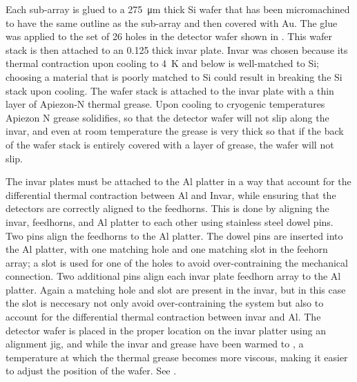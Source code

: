 Each sub-array is glued to a \SI{275}{\um} thick Si wafer that has been micromachined to have the same outline as the sub-array and then covered with Au.
The glue was applied to the set of 26 holes in the detector wafer shown in .
This wafer stack is then attached to an \SI{0.125}{\in} thick invar plate.
Invar was chosen because its thermal contraction upon cooling to \SI{4}{\K} and below is well-matched to Si; choosing a material that is poorly matched to Si could result in breaking the Si stack upon cooling.
The wafer stack is attached to the invar plate with a thin layer of Apiezon-N thermal grease.
Upon cooling to cryogenic temperatures Apiezon N grease solidifies, so that the detector wafer will not slip along the invar, and even at room temperature the grease is very thick so that if the back of the wafer stack is entirely covered with a layer of grease, the wafer will not slip.

The invar plates must be attached to the Al platter in a way that account for the differential thermal contraction between Al and Invar, while ensuring that the detectors are correctly aligned to the feedhorns.
This is done by aligning the invar, feedhorns, and Al platter to each other using stainless steel dowel pins.
Two pins align the feedhorns to the Al platter.
The dowel pins are inserted into the Al platter, with one matching hole and one matching slot in the feehorn array; a slot is used for one of the holes to avoid over-contraining the mechanical connection.
Two additional pins align each invar plate feedhorn array to the Al platter.
Again a matching hole and slot are present in the invar, but in this case the slot is neccesary not only avoid over-contraining the system but also to account for the differential thermal contraction between invar and Al.
The detector wafer is placed in the proper location on the invar platter using an alignment jig, and while the invar and grease have been warmed to , a temperature at which the thermal grease becomes more viscous, making it easier to adjust the position of the wafer.
See .

